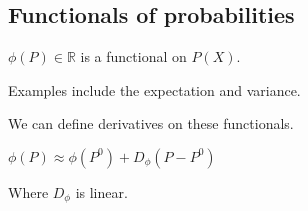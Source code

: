 
\subsection{Functionals of probabilities}

\(\phi (P)\in \mathbb{R} \) is a functional on \(P(X)\).

Examples include the expectation and variance.

We can define derivatives on these functionals.

\(\phi (P)\approx \phi (P^0)+D_\phi (P-P^0)\)

Where \(D_\phi \) is linear.

